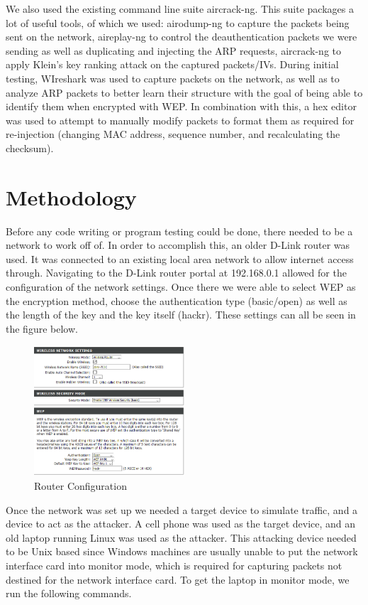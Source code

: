 \documentclass[10pt, titlepage]{article}
\begin{document}
We also used the existing command line suite aircrack-ng. This suite packages a lot of useful tools, of which we used: airodump-ng to capture the packets being sent on the network, aireplay-ng to control the deauthentication packets we were sending as well as duplicating and injecting the ARP requests, aircrack-ng to apply Klein’s key ranking attack on the captured packets/IVs. During initial testing, WIreshark was used to capture packets on the network, as well as to analyze ARP packets to better learn their structure with the goal of being able to identify them when encrypted with WEP. In combination with this, a hex editor was used to attempt to manually modify packets to format them as required for re-injection (changing MAC address, sequence number, and recalculating the checksum).

\section{Methodology}
Before any code writing or program testing could be done, there needed to be a network to work off of. In order to accomplish this, an older D-Link router was used. It was connected to an existing local area network to allow internet access through. Navigating to the D-Link router portal at 192.168.0.1 allowed for the configuration of the network settings. Once there we were able to select WEP as the encryption method, choose the authentication type (basic/open) as well as the length of the key and the key itself (hackr). These settings can all be seen in the figure below.\\

\begin{figure}[H]
 	\centering
    \includegraphics[width=0.5\textwidth]{./images/wep_settings.png}
    \caption{Router Configuration}
\end{figure}

Once the network was set up we needed a target device to simulate traffic, and a device to act as the attacker. A cell phone was used as the target device, and an old laptop running Linux was used as the attacker. This attacking device needed to be Unix based since Windows machines are usually unable to put the network interface card into monitor mode, which is required for capturing packets not destined for the network interface card. To get the laptop in monitor mode, we run the following commands.\\
\end{document}
